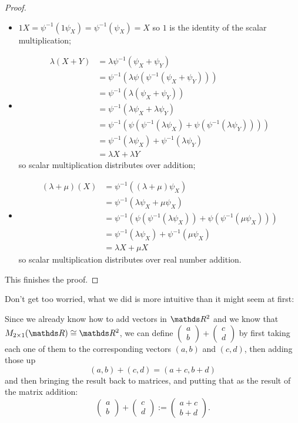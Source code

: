 \begin{proof}
\begin{itemize}
		\item $1X=\psi^{-1}(1\psi_X)=\psi^{-1}(\psi_X)=X$ so $1$ is the identity of the scalar multiplication;
		
		\item \begin{align*}
			\lambda(X+Y)&=\lambda \psi^{-1}(\psi_X+\psi_Y)\\
			&=\psi^{-1}(\lambda \psi(\psi^{-1}(\psi_X+\psi_Y)))\\
			&=\psi^{-1}(\lambda (\psi_X+\psi_Y))\\
			&=\psi^{-1}(\lambda \psi_X+\lambda \psi_Y)\\
			&=\psi^{-1}(\psi(\psi^{-1}(\lambda \psi_X)+\psi(\psi^{-1}(\lambda \psi_Y))))\\
			&=\psi^{-1}(\lambda \psi_X)+\psi^{-1}(\lambda \psi_Y)\\
			&=\lambda X+\lambda Y
		\end{align*}so scalar multiplication distributes over addition;
		
		\item \begin{align*}
			(\lambda+\mu)(X)&=\psi^{-1}((\lambda+\mu)\psi_X)\\
			&=\psi^{-1}(\lambda \psi_X+\mu \psi_X)\\
			&=\psi^{-1}(\psi(\psi^{-1}(\lambda \psi_X))+\psi(\psi^{-1}(\mu \psi_X)))\\
			&=\psi^{-1}(\lambda \psi_X)+\psi^{-1}(\mu \psi_X)\\
			&=\lambda X+\mu X
		\end{align*}so scalar multiplication distributes over real number addition.
	\end{itemize}

This finishes the proof.
\end{proof}

Don't get too worried, what we did is more intuitive than it might seem at first:

Since we already know how to add vectors in $\R^2$ and we know that $M_{2\times 1}(\R)\iso \R^2$, we can define $\begin{pmatrix}
a\\b
\end{pmatrix}+\begin{pmatrix}
c\\d
\end{pmatrix}$ by first taking each one of them to the corresponding vectors $(a,b)$ and $(c,d)$, then adding those up
\[(a,b)+(c,d)=(a+c,b+d)\]and then bringing the result back to matrices, and putting that as the result of the matrix addition:
\[\begin{pmatrix}
a\\b
\end{pmatrix}+\begin{pmatrix}
c\\d
\end{pmatrix}:=\begin{pmatrix}
a+c\\b+d
\end{pmatrix}.\]

